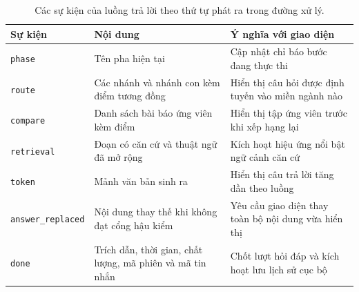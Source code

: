 \begin{table}[htbp]
    \centering
    \caption{Các sự kiện của luồng trả lời theo thứ tự phát ra trong đường xử lý.}
    \label{tab:su-kien-sse-chi-tiet}
    \small
    \begin{tabularx}{\textwidth}{@{}>{\raggedright\arraybackslash}p{3.35cm}>{\raggedright\arraybackslash}p{5.35cm}>{\raggedright\arraybackslash}X@{}}
        \toprule
        \textbf{Sự kiện} & \textbf{Nội dung} & \textbf{Ý nghĩa với giao diện} \\
        \midrule
        \texttt{phase} & Tên pha hiện tại & Cập nhật chỉ báo bước đang thực thi \\
        \texttt{route} & Các nhánh và nhánh con kèm điểm tương đồng & Hiển thị câu hỏi được định tuyến vào miền ngành nào \\
        \texttt{compare} & Danh sách bài báo ứng viên kèm điểm & Hiển thị tập ứng viên trước khi xếp hạng lại \\
        \texttt{retrieval} & Đoạn có căn cứ và thuật ngữ đã mở rộng & Kích hoạt hiệu ứng nổi bật ngữ cảnh căn cứ \\
        \texttt{token} & Mảnh văn bản sinh ra & Hiển thị câu trả lời tăng dần theo luồng \\
        \texttt{answer\_replaced} & Nội dung thay thế khi không đạt cổng hậu kiểm & Yêu cầu giao diện thay toàn bộ nội dung vừa hiển thị \\
        \texttt{done} & Trích dẫn, thời gian, chất lượng, mã phiên và mã tin nhắn & Chốt lượt hỏi đáp và kích hoạt lưu lịch sử cục bộ \\
        \bottomrule
    \end{tabularx}
\end{table}

